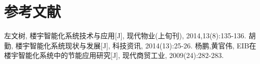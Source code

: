 \documentclass[12pt, a4paper, oneside]{ctexart} %
\begin{document}






\section{参考文献}
\begin{thebibliography}{99}
     左文树, 楼宇智能化系统技术与应用[J], 现代物业(上旬刊), 2014,13(8):135-136.
     胡勤, 楼宇智能化系统现状与发展[J], 科技资讯, 2014(13):25-26.
     杨鹏,黄官伟, EIB在楼宇智能化系统中的节能应用研究[J], 现代商贸工业, 2009(24):282-283.
    
\end{thebibliography}

\end{document}
